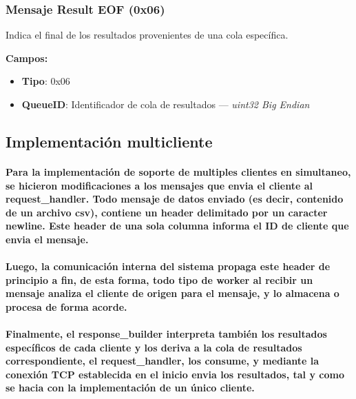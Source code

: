 \documentclass[titlepage,a4paper]{article}
\begin{document}
\subsubsection{Mensaje Result EOF (0x06)}

Indica el final de los resultados provenientes de una cola específica.

\textbf{Campos:}
\begin{itemize}
	\item \textbf{Tipo}: 0x06
	\item \textbf{QueueID}: Identificador de cola de resultados — \textit{uint32 Big Endian}
\end{itemize}

\subsection{Implementación multicliente}

\paragraph{Para la implementación de soporte de multiples clientes en simultaneo, se hicieron modificaciones a los mensajes que envia el cliente al request\_handler. Todo mensaje de datos enviado (es decir, contenido de un archivo csv), contiene un header delimitado por un caracter newline. Este header de una sola columna informa el ID de cliente que envia el mensaje.}

\paragraph{Luego, la comunicación interna del sistema propaga este header de principio a fin, de esta forma, todo tipo de worker al recibir un mensaje analiza el cliente de origen para el mensaje, y lo almacena o procesa de forma acorde.}

\paragraph{Finalmente, el response\_builder interpreta también los resultados específicos de cada cliente y los deriva a la cola de resultados correspondiente, el request\_handler, los consume, y mediante la conexión TCP establecida en el inicio envia los resultados, tal y como se hacia con la implementación de un único cliente.}
\end{document}
